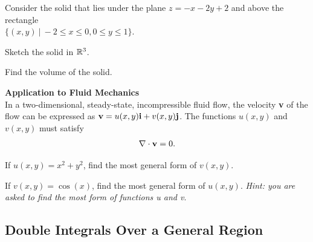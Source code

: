 \documentclass{article}
\begin{document}
\BEN
\item %
Consider the solid that lies under the plane $z = -x-2y+2$ and above the rectangle \\$\{(x,y) \ | \ -2\le x\le 0, 0\le y \le1 \}$.
\BEN
\item Sketch the solid in $\mathbb{R}^3$. 
\item Find the volume of the solid.
\EEN
\item %
\textbf{Application to Fluid Mechanics} \\
In a two-dimensional, steady-state, incompressible fluid flow, the velocity \textbf{v} of the flow can be expressed as $\mathbf{v} = u(x,y)\mathbf{i} + v(x,y)\mathbf{j}$. The functions $u(x,y)$ and $v(x,y)$ must satisfy 
\begin{align*}
  \nabla\cdot\mathbf{v} = 0.
\end{align*}
\BEN
\item If $u(x,y) = x^2 + y^2$, find the most general form of $v(x,y)$. 
\item If $v(x,y) = \cos(x)$, find the most general form of $u(x,y)$.
\EEN
\textit{Hint: you are asked to find the most  form of functions u and v}.

\EEN %
\subsection{Double Integrals Over a General Region}
\end{document}
